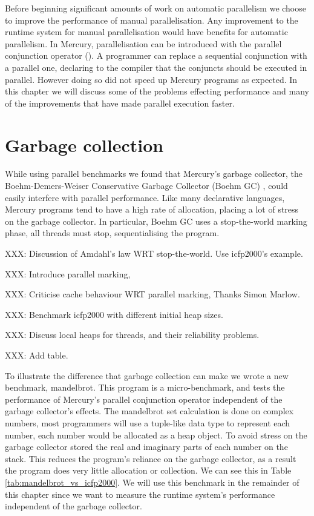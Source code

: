 
    
Before beginning significant amounts of work on automatic parallelism we
choose to improve the performance of manual parallelisation.
Any improvement to the runtime system for manual parallelisation would have
benefits for automatic parallelism.
In Mercury, parallelisation can be introduced with the parallel conjunction
operator (\code{\&}).
A programmer can replace a sequential conjunction with a parallel one,
declaring to the compiler that the conjuncts should be executed in parallel.
However doing so did not speed up Mercury programs as expected.
In this chapter we will discuss
some of the problems effecting performance and
many of the improvements that have made parallel execution faster.

\section{Garbage collection}

While using parallel benchmarks we found that Mercury's garbage collector,
the Boehm-Demers-Weiser Conservative Garbage Collector (Boehm GC)
\citep{boehm_gc},
could easily interfere with parallel performance.
Like many declarative languages,
Mercury programs tend to have a high rate of allocation,
placing a lot of stress on the garbage collector.
In particular,
Boehm GC uses a stop-the-world marking phase,
all threads must stop, sequentialising the program.

XXX: Discussion of Amdahl's law WRT stop-the-world.
Use icfp2000's example.

XXX: Introduce parallel marking,

XXX: Criticise cache behaviour WRT parallel marking,
Thanks Simon Marlow.

XXX: Benchmark icfp2000 with different initial heap sizes.

XXX: Discuss local heaps for threads, and their reliability problems.

XXX: Add table.

To illustrate the difference that garbage collection can make we wrote a new
benchmark, mandelbrot.
This program is a micro-benchmark, and tests the performance of 
Mercury's parallel conjunction operator independent of the garbage
collector's effects.
The mandelbrot set calculation is done on complex numbers,
most programmers will use a tuple-like data type to represent each number,
each number would be allocated as a heap object.
To avoid stress on the garbage collector stored the real and imaginary parts
of each number on the stack.
This reduces the program's reliance on the garbage collector,
as a result the program does very little allocation or collection.
We can see this in Table \ref{tab:mandelbrot_vs_icfp2000}.
We will use this benchmark in the remainder of this chapter since we want to
measure the runtime system's performance independent of the garbage collector.

